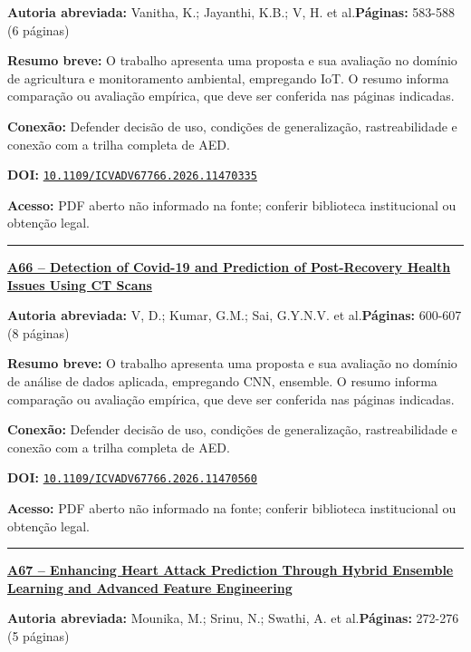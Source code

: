 \documentclass[10pt,a4paper]{article}
\begin{document}
\textbf{Autoria abreviada:} Vanitha, K.; Jayanthi, K.B.; V, H. et al.\quad \textbf{Páginas:} 583-588 (6 páginas)\par
\textbf{Resumo breve:} O trabalho apresenta uma proposta e sua avaliação no domínio de agricultura e monitoramento ambiental, empregando IoT. O resumo informa comparação ou avaliação empírica, que deve ser conferida nas páginas indicadas.\par
\textbf{Conexão:} Defender decisão de uso, condições de generalização, rastreabilidade e conexão com a trilha completa de AED.\par
\textbf{DOI:} \href{https://doi.org/10.1109/ICVADV67766.2026.11470335}{\nolinkurl{10.1109/ICVADV67766.2026.11470335}}\par
\textbf{Acesso:} PDF aberto não informado na fonte; conferir biblioteca institucional ou obtenção legal.\par
\noindent\rule{\textwidth}{0.35pt}
\par\medskip\noindent
{\large\bfseries\href{https://doi.org/10.1109/ICVADV67766.2026.11470560}{A66 -- Detection of Covid-19 and Prediction of Post-Recovery Health Issues Using CT Scans}}\par\smallskip
\textbf{Autoria abreviada:} V, D.; Kumar, G.M.; Sai, G.Y.N.V. et al.\quad \textbf{Páginas:} 600-607 (8 páginas)\par
\textbf{Resumo breve:} O trabalho apresenta uma proposta e sua avaliação no domínio de análise de dados aplicada, empregando CNN, ensemble. O resumo informa comparação ou avaliação empírica, que deve ser conferida nas páginas indicadas.\par
\textbf{Conexão:} Defender decisão de uso, condições de generalização, rastreabilidade e conexão com a trilha completa de AED.\par
\textbf{DOI:} \href{https://doi.org/10.1109/ICVADV67766.2026.11470560}{\nolinkurl{10.1109/ICVADV67766.2026.11470560}}\par
\textbf{Acesso:} PDF aberto não informado na fonte; conferir biblioteca institucional ou obtenção legal.\par
\noindent\rule{\textwidth}{0.35pt}
\par\medskip\noindent
{\large\bfseries\href{https://doi.org/10.1109/ICVADV67766.2026.11470417}{A67 -- Enhancing Heart Attack Prediction Through Hybrid Ensemble Learning and Advanced Feature Engineering}}\par\smallskip
\textbf{Autoria abreviada:} Mounika, M.; Srinu, N.; Swathi, A. et al.\quad \textbf{Páginas:} 272-276 (5 páginas)\par
\end{document}
